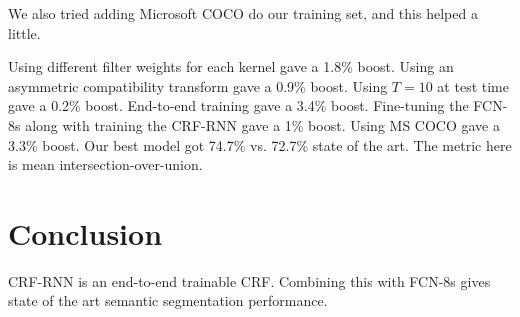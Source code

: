 \documentclass[a4paper]{article}
\begin{document}
We also tried adding Microsoft COCO do our training set, and this helped a
little.

Using different filter weights for each kernel gave a 1.8\% boost. Using
an asymmetric compatibility transform gave a 0.9\% boost. Using $T = 10$
at test time gave a 0.2\% boost. End-to-end training gave a 3.4\% boost.
Fine-tuning the FCN-8s along with training the CRF-RNN gave a 1\% boost. Using
MS COCO gave a 3.3\% boost. Our best model got 74.7\% vs. 72.7\% state of
the art. The metric here is mean intersection-over-union.

\section{Conclusion}
CRF-RNN is an end-to-end trainable CRF. Combining this with FCN-8s gives state
of the art semantic segmentation performance.
\end{document}
